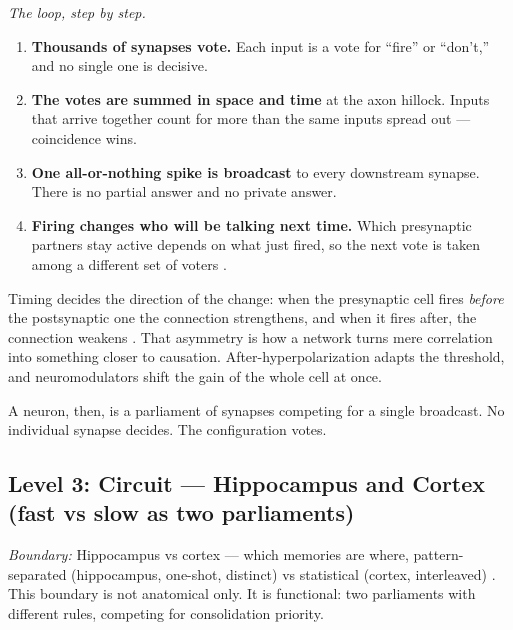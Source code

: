 \documentclass[11pt]{article}
\begin{document}
{\textit{The loop, step by step.}
\begin{enumerate}\itemsep2pt
\item \textbf{Thousands of synapses vote.} Each input is a vote for
``fire'' or ``don't,'' and no single one is decisive.
\item \textbf{The votes are summed in space and time} at the axon hillock.
Inputs that arrive together count for more than the same inputs spread out
--- coincidence wins.
\item \textbf{One all-or-nothing spike is broadcast} to every downstream
synapse. There is no partial answer and no private answer.
\item \textbf{Firing changes who will be talking next time.} Which
presynaptic partners stay active depends on what just fired, so the next
vote is taken among a different set of voters \citep{white1986,dorkenwald2023}.
\end{enumerate}

Timing decides the direction of the change: when the presynaptic cell
fires \emph{before} the postsynaptic one the connection strengthens, and
when it fires after, the connection weakens \citep{bipoo1998}. That
asymmetry is how a network turns mere correlation into something closer to
causation. After-hyperpolarization adapts the threshold, and
neuromodulators shift the gain of the whole cell at once.

A neuron, then, is a parliament of synapses competing for a single
broadcast. No individual synapse decides. The configuration votes.

\subsection{Level 3: Circuit --- Hippocampus and Cortex (fast vs slow as two parliaments)}

\textit{Boundary:} Hippocampus vs cortex --- which memories are where, pattern-separated (hippocampus, one-shot, distinct) vs statistical (cortex, interleaved) \citep{tononi2014}. This boundary is not anatomical only. It is functional: two parliaments with different rules, competing for consolidation priority.

}
\end{document}
